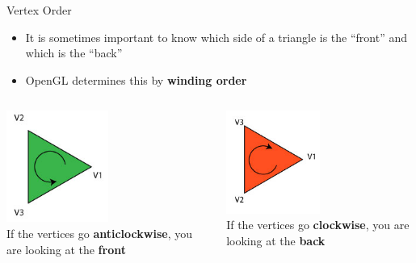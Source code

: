 \begin{frame}{Vertex Order}
	\begin{itemize}
		\pause\item It is sometimes important to know which side of a triangle is the ``front'' and which is the ``back''
		\pause\item OpenGL determines this by \textbf{winding order}
	\end{itemize}
	\begin{columns}
		\pause
		\begin{column}{0.48\textwidth}
			\begin{center}
				\includegraphics[width=0.5\textwidth]{winding_ccw}\\
				If the vertices go \textbf{anticlockwise}, you are looking at the \textbf{front}
			\end{center}
		\end{column}
		\pause
		\begin{column}{0.48\textwidth}
			\begin{center}
				\includegraphics[width=0.5\textwidth]{winding_cw}\\				
				If the vertices go \textbf{clockwise}, you are looking at the \textbf{back}
			\end{center}
		\end{column}
	\end{columns}
\end{frame}

